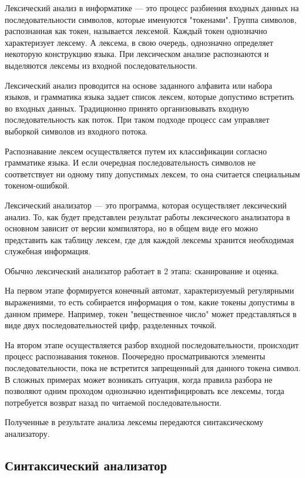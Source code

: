 \documentclass[bachelor, och, coursework, times]{SCWorks}
\begin{document}
Лексический анализ в информатике --- это процесс разбиения входных данных на последовательности символов, которые именуются "токенами". Группа символов, распознанная как токен, называется лексемой. Каждый токен однозначно характеризует лексему. А лексема, в свою очередь, однозначно определяет некоторую конструкцию языка. При лексическом анализе распознаются и выделяются лексемы из входной последовательности.

Лексический анализ проводится на основе заданного алфавита или набора языков, и грамматика языка задает список лексем, которые допустимо встретить во входных данных.
Традиционно принято организовывать входную последовательность как поток. При таком подходе процесс сам управляет выборкой символов из входного потока.

Распознавание лексем осуществляется путем их классификации согласно грамматике языка. 
И если очередная последовательность символов не соответствует ни одному типу допустимых лексем, то она считается специальным токеном-ошибкой.

Лексический анализатор --- это программа, которая осуществляет лексический анализ.
То, как будет представлен результат работы лексического анализатора в основном зависит от версии компилятора, но в общем виде его можно представить как таблицу лексем, где для каждой лексемы хранится необходимая служебная информация.

Обычно лексический анализатор работает в 2 этапа: сканирование и оценка.

На первом этапе формируется конечный автомат, характеризуемый регулярными выражениями, то есть собирается информация о том, какие токены допустимы в данном примере. Например, токен "вещественное число" может представляться в виде двух последовательностей цифр, разделенных точкой.

На втором этапе осуществляется разбор входной последовательности, происходит процесс распознавания токенов. Поочередно просматриваются элементы последовательности, пока не встретится запрещенный для данного токена символ. В сложных примерах может возникать ситуация, когда правила разбора не позволяют одним проходом однозначно идентифицировать все лексемы, тогда потребуется возврат назад по читаемой последовательности.

Полученные в результате анализа лексемы передаются синтаксическому анализатору.~\cite{Compilers}

\subsection{Синтаксический анализатор}
\end{document}

